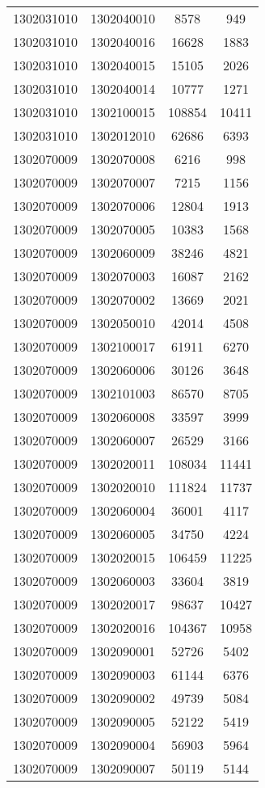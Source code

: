 \begin{longtable}{llcc}
1302031010 & 1302040010 & 8578 & 949\\
1302031010 & 1302040016 & 16628 & 1883\\
1302031010 & 1302040015 & 15105 & 2026\\
1302031010 & 1302040014 & 10777 & 1271\\
1302031010 & 1302100015 & 108854 & 10411\\
1302031010 & 1302012010 & 62686 & 6393\\
1302070009 & 1302070008 & 6216 & 998\\
1302070009 & 1302070007 & 7215 & 1156\\
1302070009 & 1302070006 & 12804 & 1913\\
1302070009 & 1302070005 & 10383 & 1568\\
1302070009 & 1302060009 & 38246 & 4821\\
1302070009 & 1302070003 & 16087 & 2162\\
1302070009 & 1302070002 & 13669 & 2021\\
1302070009 & 1302050010 & 42014 & 4508\\
1302070009 & 1302100017 & 61911 & 6270\\
1302070009 & 1302060006 & 30126 & 3648\\
1302070009 & 1302101003 & 86570 & 8705\\
1302070009 & 1302060008 & 33597 & 3999\\
1302070009 & 1302060007 & 26529 & 3166\\
1302070009 & 1302020011 & 108034 & 11441\\
1302070009 & 1302020010 & 111824 & 11737\\
1302070009 & 1302060004 & 36001 & 4117\\
1302070009 & 1302060005 & 34750 & 4224\\
1302070009 & 1302020015 & 106459 & 11225\\
1302070009 & 1302060003 & 33604 & 3819\\
1302070009 & 1302020017 & 98637 & 10427\\
1302070009 & 1302020016 & 104367 & 10958\\
1302070009 & 1302090001 & 52726 & 5402\\
1302070009 & 1302090003 & 61144 & 6376\\
1302070009 & 1302090002 & 49739 & 5084\\
1302070009 & 1302090005 & 52122 & 5419\\
1302070009 & 1302090004 & 56903 & 5964\\
1302070009 & 1302090007 & 50119 & 5144\\

\end{longtable}
